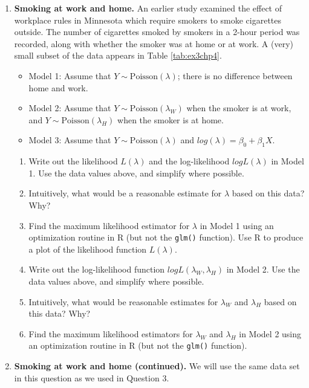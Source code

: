 \documentclass[
]{krantz}
\providecommand{\tightlist}{%
  \setlength{\itemsep}{0pt}\setlength{\parskip}{0pt}}
\begin{document}
\begin{enumerate}
\def\labelenumi{\arabic{enumi}.}
\setcounter{enumi}{2}
\item
  \textbf{Smoking at work and home.} An earlier study examined the effect of workplace rules in Minnesota which require smokers to smoke cigarettes outside. The number of cigarettes smoked by smokers in a 2-hour period was recorded, along with whether the smoker was at home or at work. A (very) small subset of the data appears in Table \ref{tab:ex3chp4}.

  \begin{itemize}
  \tightlist
  \item
    Model 1: Assume that \(Y \sim \textrm{Poisson}(\lambda)\); there is no difference between home and work.
  \item
    Model 2: Assume that \(Y \sim \textrm{Poisson}(\lambda_W)\) when the smoker is at work, and \(Y \sim \textrm{Poisson}(\lambda_H)\) when the smoker is at home.
  \item
    Model 3: Assume that \(Y \sim \textrm{Poisson}(\lambda)\) and \(log(\lambda)=\beta_0+\beta_1X\).
  \end{itemize}

  \begin{enumerate}
  \def\labelenumii{\alph{enumii}.}
  \tightlist
  \item
    Write out the likelihood \(L(\lambda)\) and the log-likelihood \(logL(\lambda)\) in Model 1. Use the data values above, and simplify where possible.
  \item
    Intuitively, what would be a reasonable estimate for \(\lambda\) based on this data? Why?
  \item
    Find the maximum likelihood estimator for \(\lambda\) in Model 1 using an optimization routine in R (but not the \texttt{glm()} function). Use R to produce a plot of the likelihood function \(L(\lambda)\).
  \item
    Write out the log-likelihood function \(logL(\lambda_W, \lambda_H)\) in Model 2. Use the data values above, and simplify where possible.
  \item
    Intuitively, what would be reasonable estimates for \(\lambda_W\) and \(\lambda_H\) based on this data? Why?
  \item
    Find the maximum likelihood estimators for \(\lambda_W\) and \(\lambda_H\) in Model 2 using an optimization routine in R (but not the \texttt{glm()} function).
  \end{enumerate}
\item
  \textbf{Smoking at work and home (continued).} We will use the same data set in this question as we used in Question 3.


\end{enumerate}
\end{document}
